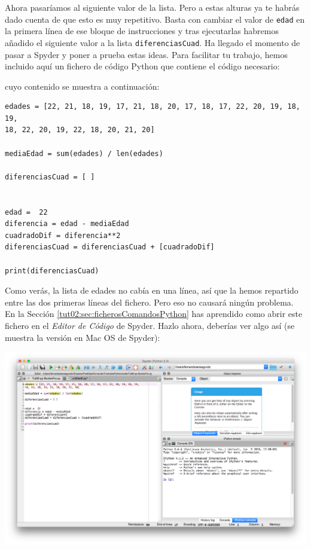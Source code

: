 \documentclass[10pt,a4paper]{article}\usepackage[]{graphicx}\usepackage[]{color}
\makeatletter
\newenvironment{kframe}{%
 \def\at@end@of@kframe{}%
 \ifinner\ifhmode%
  \def\at@end@of@kframe{\end{minipage}}%
  \begin{minipage}{\columnwidth}%
 \fi\fi%
 \def\FrameCommand##1{\hskip\@totalleftmargin \hskip-\fboxsep
 \colorbox{shadecolor}{##1}\hskip-\fboxsep
     \hskip-\linewidth \hskip-\@totalleftmargin \hskip\columnwidth}%
 \MakeFramed {\advance\hsize-\width
   \@totalleftmargin\z@ \linewidth\hsize
   \@setminipage}}%
 {\par\unskip\endMakeFramed%
 \at@end@of@kframe}
\newenvironment{knitrout}{}{} %
\newcounter {cont01}
\makeatother
\begin{document}
Ahora pasaríamos al siguiente valor de la lista. Pero a estas alturas ya te habrás dado cuenta de que esto es muy repetitivo. Basta con cambiar el valor de {\tt edad} en la primera línea de ese bloque de instrucciones y tras ejecutarlas habremos añadido el siguiente valor a la lista {\tt diferenciasCuad}. Ha llegado el momento de pasar a Spyder y poner a prueba estas ideas. Para facilitar tu trabajo, hemos incluido aquí un fichero de código Python que contiene el código necesario:

\begin{center}
\end{center}
cuyo contenido se muestra a continuación:
\begin{knitrout}
\color{fgcolor}\begin{kframe}
\begin{verbatim}
edades = [22, 21, 18, 19, 17, 21, 18, 20, 17, 18, 17, 22, 20, 19, 18, 19,
18, 22, 20, 19, 22, 18, 20, 21, 20]

mediaEdad = sum(edades) / len(edades)

diferenciasCuad = [ ]


edad =  22
diferencia = edad - mediaEdad
cuadradoDif = diferencia**2
diferenciasCuad = diferenciasCuad + [cuadradoDif]

print(diferenciasCuad)
\end{verbatim}
\end{kframe}
\end{knitrout}
Como verás, la lista de edades no cabía en una línea, así que la hemos repartido entre las dos primeras líneas del fichero. Pero eso no causará ningún problema. En la Sección \ref{tut02:sec:ficherosComandosPython} has aprendido como abrir este fichero en el {\em Editor de Código} de Spyder. Hazlo ahora, deberías ver algo así (se muestra la versión en Mac OS de Spyder):
\begin{center}
\includegraphics[width=16cm]{../fig/Tut-02-py-32-programaBucles01.png}
\end{center}
\end{document}
